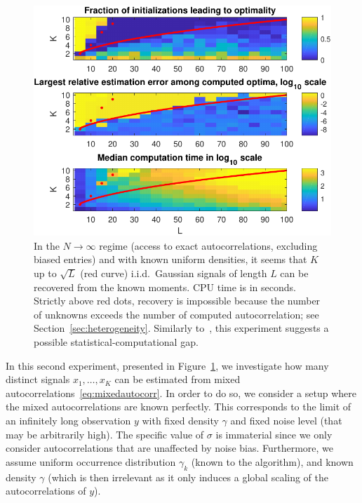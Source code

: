 \documentclass[12pt]{article}
\newcommand{\1}{\mathbf{1}}
\theoremstyle{plain}
\theoremstyle{definition}
\theoremstyle{remark}
\theoremstyle{plain}
\theoremstyle{remark}
\theoremstyle{plain}
\theoremstyle{plain}
\theoremstyle{plain}
\numberwithin{equation}{section}
\begin{document}
\begin{figure}[t]
	\centering
	\includegraphics[width=.7\linewidth]{KLXP/XP1}
	\caption{In the $N \to \infty$ regime (access to exact autocorrelations, excluding biased entries) and with known uniform densities, it seems that $K$ up to $\sqrt{L}$ (red curve) i.i.d.\ Gaussian signals of length $L$ can be recovered from the known moments. CPU time is in seconds. Strictly above red dots, recovery is impossible because the number of unknowns exceeds the number of computed autocorrelation; see Section~\ref{sec:heterogeneity}. Similarly to~\cite[Fig.~4.1]{boumal2017heterogeneous}, this experiment suggests a possible statistical-computational gap.}
	\label{fig:KLXP}
\end{figure}

In this second experiment, presented in Figure~\ref{fig:KLXP}, we investigate how many distinct signals ${x_1, \ldots, x_K}$ can be estimated from mixed autocorrelations~\eqref{eq:mixedautocorr}. In order to do so, we consider a setup where the mixed autocorrelations are known perfectly. This corresponds to the limit of an infinitely long observation $y$ with fixed density $\gamma$ and fixed noise level (that may be arbitrarily high). The specific value of $\sigma$ is immaterial since we only consider autocorrelations that are unaffected by noise bias. Furthermore, we assume uniform occurrence distribution $\gamma_k$ (known to the algorithm), and known density $\gamma$ (which is then irrelevant as it only induces a global scaling of the autocorrelations of $y$).
\end{document}
